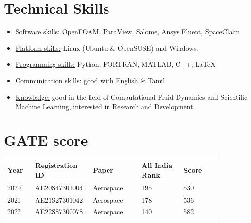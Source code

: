 \section{Technical Skills}

	\begin{itemize}
		\item \underline{Software skills:} OpenFOAM, ParaView, Salome, Ansys Fluent, SpaceClaim
		\item \underline{Platform skills:} Linux (Ubuntu \& OpenSUSE) and Windows.
		\item \underline{Programming skills:} Python, FORTRAN, MATLAB, C++, \LaTeX
		\item \underline{Communication skills:} good with English \& Tamil
		\item \underline{Knowledge:} good in the field of Computational Fluid Dynamics and Scientific Machine Learning, interested in Research and Development.
	\end{itemize}

		\pagebreak

\section{GATE score}

\begin{table}[!h]
	\begin{tabular}{p{0.12\linewidth}p{0.20\linewidth}p{0.21\linewidth}p{0.18\linewidth}p{0.17\linewidth}}
		\toprule
		\textbf{Year} & \textbf{Registration ID} & \textbf{Paper} & \textbf{All India Rank} & \textbf{Score} \\ \midrule
		2020 & AE20S47301004 & Aerospace & 195 & 530 \\
		2021 & AE21S27301042 & Aerospace & 178 & 536 \\
		2022 & AE22S87300078 & Aerospace & 140 & 582 \\ \bottomrule
	\end{tabular}
\end{table}
